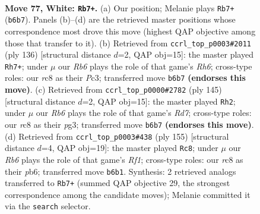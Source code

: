 \documentclass[11pt]{article}
\begin{document}
\clearpage

\begin{figure}[p]\centering
\begin{subfigure}{0.46\textwidth}\centering
\resizebox{\linewidth}{!}{%
\newchessgame
\chessboard[
  setfen={2r5/7k/1R6/8/5K2/8/3r3P/8 w - - 21 77},
  showmover=false,
  pgfstyle=straightmove, color=movearrow, markmove={b6-b7}
]}
\caption{}
\end{subfigure}\hfill
\begin{subfigure}{0.46\textwidth}\centering
\resizebox{\linewidth}{!}{%
\newchessgame
\chessboard[
  setfen={8/1k6/7R/2K5/P7/2P5/8/r7 w - - 25 69},
  showmover=false,
  pgfstyle=straightmove, color=movearrow, markmove={h6-h7}
]}
\caption{}
\end{subfigure}
\\[4pt]
\begin{subfigure}{0.46\textwidth}\centering
\resizebox{\linewidth}{!}{%
\newchessgame
\chessboard[
  setfen={8/2k5/4R2p/8/8/1K4P1/3r4/8 b - - 12 73},
  showmover=false,
  pgfstyle=straightmove, color=movearrow, markmove={d2-h2}
]}
\caption{}
\end{subfigure}\hfill
\begin{subfigure}{0.46\textwidth}\centering
\resizebox{\linewidth}{!}{%
\newchessgame
\chessboard[
  setfen={5r2/6R1/1P1k4/8/4K3/6p1/8/8 b - - 1 78},
  showmover=false,
  pgfstyle=straightmove, color=movearrow, markmove={f8-c8}
]}
\caption{}
\end{subfigure}
\caption{\textbf{Move 77, White: \texttt{Rb7+}.} (a) Our position; Melanie plays \texttt{Rb7+} (\texttt{b6b7}). Panels (b)--(d) are the retrieved master positions whose correspondence most drove this move (highest QAP objective among those that transfer to it). (b) Retrieved from \texttt{ccrl\_top\_p0003\#2011} (ply 136) [structural distance $d$=2, QAP obj=15]: the master played \texttt{Rh7+}; under $\mu$ our \emph{Rb6} plays the role of that game's \emph{Rh6}; cross-type roles: our \emph{r}c8 as their \emph{P}c3; transferred move \texttt{b6b7} \textbf{(endorses this move)}. (c) Retrieved from \texttt{ccrl\_top\_p0000\#2782} (ply 145) [structural distance $d$=2, QAP obj=15]: the master played \texttt{Rh2}; under $\mu$ our \emph{Rb6} plays the role of that game's \emph{Rd7}; cross-type roles: our \emph{r}c8 as their \emph{p}g3; transferred move \texttt{b6b7} \textbf{(endorses this move)}. (d) Retrieved from \texttt{ccrl\_top\_p0003\#438} (ply 155) [structural distance $d$=4, QAP obj=19]: the master played \texttt{Rc8}; under $\mu$ our \emph{Rb6} plays the role of that game's \emph{Rf1}; cross-type roles: our \emph{r}c8 as their \emph{p}b6; transferred move \texttt{b6b1}. Synthesis: 2 retrieved analogs transferred to \texttt{Rb7+} (summed QAP objective 29, the strongest correspondence among the candidate moves); Melanie committed it via the \texttt{search} selector.}
\label{fig:thought-m152}
\end{figure}
\end{document}
